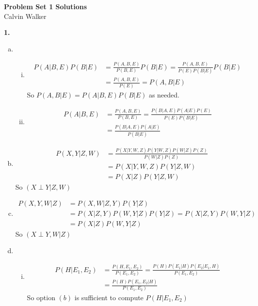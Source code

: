 \documentclass{article}
\begin{document}
\begin{center}
    \Large{\textbf{Problem Set 1 Solutions}} \\[0.25ex]
    Calvin Walker
\end{center}
\textbf{1.}
\begin{enumerate}[(a)]
    \item \begin{enumerate}[(i)]
        \item \begin{align*}
            P(A|B, E)P(B | E) &= \frac{P(A, B, E)}{P(B, E)}P(B|E) = \frac{P(A, B, E)}{P(E)P(B|E)}P(B|E) \\[0.5ex]
            &= \frac{P(A, B, E)}{P(E)} = P(A, B | E)
        \end{align*}
        So $P(A, B | E) =  P(A|B, E)P(B | E)$ as needed. 
        \item \begin{align*}
            P(A|B,E) &= \frac{P(A, B, E)}{P(B, E)} = \frac{P(B|A,E)P(A|E)P(E)}{P(E)P(B|E)} \\[0.5ex]
            &= \frac{P(B|A,E)P(A|E)}{P(B|E)} 
        \end{align*}
    \end{enumerate}
    \item \begin{align*}
        P(X, Y | Z, W) &= \frac{P(X|Y, W, Z) P(Y | W, Z) P(W | Z) P(Z)}{P(W | Z) P(Z)}\\ 
        &= P(X|Y, W, Z)P(Y|Z,W)\\
        &= P(X|Z)P(Y|Z,W)
    \end{align*}
    So $(X \perp Y|Z, W)$
    \item \begin{align*}
        P(X, Y, W | Z) &= P(X, W | Z, Y)P(Y | Z) \\ 
        &= P(X|Z, Y)P(W, Y | Z)P(Y|Z) = P(X|Z, Y)P(W, Y|Z) \\
        &= P(X|Z)P(W, Y|Z)
    \end{align*}
    So $(X \perp Y, W | Z)$
    \item \begin{enumerate}[(i)]
        \item \begin{align*}
            P(H|E_1, E_2) &= \frac{P(H, E_1, E_2)}{P(E_1, E_2)} = \frac{P(H)P(E_1|H)P(E_2|E_1, H)}{P(E_1, E_2)} \\
            &= \frac{P(H)P(E_1, E_2 | H)}{P(E_1, E_2)}
        \end{align*}
        So option $(b)$ is sufficient to compute $P(H|E_1, E_2)$

\end{enumerate}
\end{enumerate}
\end{document}
